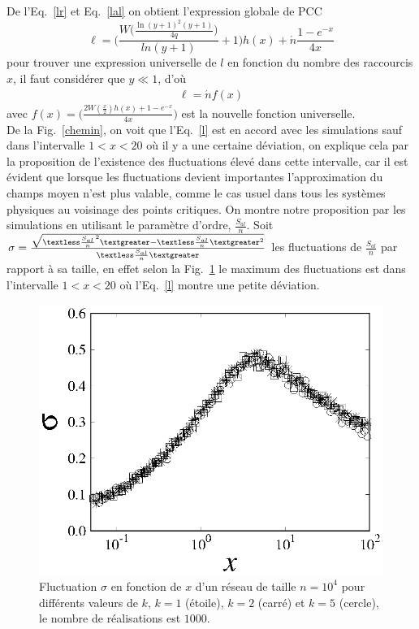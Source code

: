 De l'Eq.~\ref{lr} et Eq.~\ref{lal} on obtient l'expression globale de PCC 
\begin{equation}
\ell=\bigg(\frac{W\big(\frac{\ln(y+1)^2(y+1)}{4q}\big)}{ln(y+1)}+1\bigg)h(x)+\acute{n}\frac{1-e^{-x}}{4x}
\label{l}
\end{equation}
pour trouver une expression universelle de $l$ en fonction du nombre des raccourcis $x$, il faut considérer que $y\ll 1$, d'où
\begin{eqnarray}
\ell=\acute{n}f(x) 
\label{l2}
\end{eqnarray}
avec $f(x)=\big(\frac{2W(\frac{x}{2})h(x)+1-e^{-x}}{4x}\big)$ est la nouvelle fonction universelle.\\
De la Fig.~\ref{chemin}, on voit que l'Eq.~\ref{l} est en accord avec les simulations sauf dans l'intervalle
$1<x<20$  où il y a une certaine déviation, on explique cela par la proposition de l'existence des fluctuations élevé dans cette intervalle, car il est évident que lorsque les fluctuations devient importantes l'approximation du champs moyen n'est plus valable,  comme le cas usuel dans tous les systèmes physiques au voisinage des points critiques. On montre notre proposition par les simulations en utilisant le paramètre
d'ordre, $\frac{S_{al}}{n}$.
Soit $\sigma=\frac{\sqrt{\textless \frac{S_{al}}{n}^2\textgreater-\textless \frac{S_{al}}{n}\textgreater^2}}{\textless \frac{S_{al}}{n}\textgreater}$
les fluctuations de $\frac{S_{al}}{n}$ par rapport à sa taille,  en effet selon la Fig.~\ref{fluct} le maximum des fluctuations
est dans l'intervalle $1<x<20$ où l'Eq.~\ref{l} montre une petite déviation.\\

\begin{figure}[h!]
	\centering
	\includegraphics[scale=1,angle=0]{./figures/fig-f}
	\caption{Fluctuation $\sigma$ en fonction de $x$ d'un réseau de taille $n=10^4$  pour différents valeurs de $k$, $k=1$ (étoile), $k=2$ (carré) et $k=5$ (cercle), le nombre de réalisations est $1000$.}
	\label{fluct}
\end{figure}

